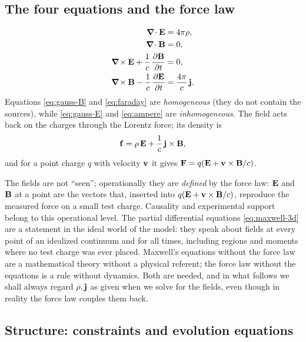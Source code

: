 \subsection{The four equations and the force law}

\begin{subequations}\label{eq:maxwell-3d}
\begin{align}
\boldsymbol{\nabla}\!\cdot\mathbf{E} &= 4\pi\rho, \label{eq:gauss-E}\\
\boldsymbol{\nabla}\!\cdot\mathbf{B} &= 0, \label{eq:gauss-B}\\
\boldsymbol{\nabla}\!\times\mathbf{E} + \frac1c\,\frac{\partial\mathbf{B}}{\partial t} &= 0, \label{eq:faraday}\\
\boldsymbol{\nabla}\!\times\mathbf{B} - \frac1c\,\frac{\partial\mathbf{E}}{\partial t} &= \frac{4\pi}{c}\,\mathbf{j}. \label{eq:ampere}
\end{align}
\end{subequations}
Equations \eqref{eq:gauss-B} and \eqref{eq:faraday} are \emph{homogeneous}
(they do not contain the sources), while \eqref{eq:gauss-E} and
\eqref{eq:ampere} are \emph{inhomogeneous}.  The field acts back on the
charges through the Lorentz force; its density is
\begin{equation}\label{eq:force-density}
\mathbf{f}=\rho\,\mathbf{E}+\frac1c\,\mathbf{j}\times\mathbf{B} ,
\end{equation}
and for a point charge $q$ with velocity $\mathbf{v}$ it gives
$\mathbf{F}=q(\mathbf{E}+\mathbf{v}\times\mathbf{B}/c)$.

\begin{remark}
The fields are not ``seen''; operationally they are \emph{defined} by
the force law: $\mathbf{E}$ and $\mathbf{B}$ at a point are the vectors that, inserted
into $q(\mathbf{E}+\mathbf{v}\times\mathbf{B}/c)$, reproduce the measured force on a small test
charge. Causality and experimental support belong to this operational
level.  The partial differential equations \eqref{eq:maxwell-3d} are a
statement in the ideal world of the model: they speak about fields at
every point of an idealized continuum and for all times, including
regions and moments where no test charge was ever placed.  Maxwell's
equations without the force law are a mathematical theory without a
physical referent; the force law without the equations is a rule
without dynamics.  Both are needed, and in what follows we shall always
regard $\rho,\mathbf{j}$ as given when we solve for the fields, even though in
reality the force law couples them back.
\end{remark}

\subsection{Structure: constraints and evolution equations}

